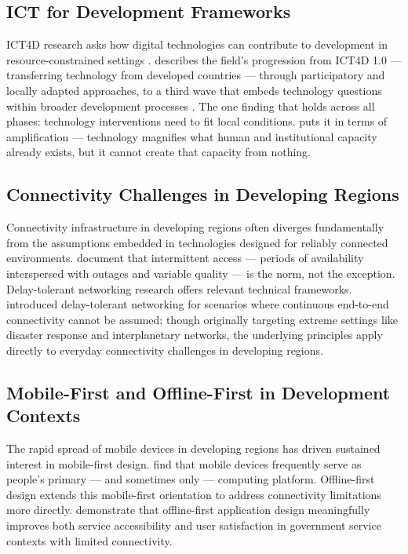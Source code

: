 \subsection{ICT for Development Frameworks}

ICT4D research asks how digital technologies can contribute to development in resource-constrained settings \citep{Avgerou2010, Walsham2017}. \citet{Heeks2018} describes the field's progression from ICT4D 1.0 --- transferring technology from developed countries --- through participatory and locally adapted approaches, to a third wave that embeds technology questions within broader development processes \citep{Zheng2018, Sahay2017, Sein2019}. The one finding that holds across all phases: technology interventions need to fit local conditions. \citet{Toyama2015} puts it in terms of amplification --- technology magnifies what human and institutional capacity already exists, but it cannot create that capacity from nothing.

\subsection{Connectivity Challenges in Developing Regions}

Connectivity infrastructure in developing regions often diverges fundamentally from the assumptions embedded in technologies designed for reliably connected environments. \citet{ChenNath2016} document that intermittent access --- periods of availability interspersed with outages and variable quality --- is the norm, not the exception. Delay-tolerant networking research offers relevant technical frameworks. \citet{Fall2003} introduced delay-tolerant networking for scenarios where continuous end-to-end connectivity cannot be assumed; though originally targeting extreme settings like disaster response and interplanetary networks, the underlying principles apply directly to everyday connectivity challenges in developing regions.

\subsection{Mobile-First and Offline-First in Development Contexts}

The rapid spread of mobile devices in developing regions has driven sustained interest in mobile-first design. \citet{Donner2015} find that mobile devices frequently serve as people's primary --- and sometimes only --- computing platform. Offline-first design extends this mobile-first orientation to address connectivity limitations more directly. \citet{Muawwal2024} demonstrate that offline-first application design meaningfully improves both service accessibility and user satisfaction in government service contexts with limited connectivity.

